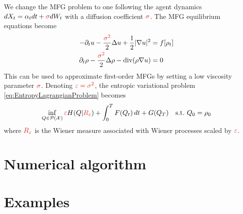 \documentclass[11pt]{article}
\newcommand{\calP}{\mathcal{P}}
\newcommand{\calX}{\mathcal{X}}
\newcommand{\suchthat}{\mathrm{s.t.}}
\renewcommand{\epsilon}{\varepsilon}
\DeclareMathOperator{\divg}{div}
\numberwithin{equation}{section}
\newcommand{\redfont}{\color{darkred}}
\theoremstyle{definition}
\begin{document}
We change the MFG problem to one following the agent dynamics $dX_t = \alpha_t dt + {\redfont\sigma} dW_t$ with a diffusion coefficient $\redfont\sigma$. The MFG equilibrium equations become
\begin{equation}
\begin{aligned}
	-\partial_t u - \frac{\redfont\sigma^2}{2}\Delta u + \frac12 |\nabla u|^2 &= f[\rho_t] \\
	\partial_t \rho - \frac{\redfont\sigma^2}{2}\Delta\rho - \divg(\rho\nabla u) &= 0
\end{aligned}	
\end{equation}
This can be used to approximate first-order MFGs by setting a low viscosity parameter $\redfont\sigma$.
Denoting $\redfont\epsilon = \sigma^2$, the entropic variational problem \eqref{eq:EntropyLagrangianProblem} becomes
\begin{equation}
	\inf_{Q\in\calP(\calX)}
	{\redfont\epsilon} H(Q|{\redfont R_{\epsilon}}) + \int_0^T F(Q_t)\,dt + G(Q_T)\quad
	\suchthat\ Q_0 = \rho_0
\end{equation}
where $\redfont R_{\epsilon}$ is the Wiener measure associated with Wiener processes scaled by $\redfont\epsilon$.

\section{Numerical algorithm}





\section{Examples}






\printbibliography{}
\end{document}
